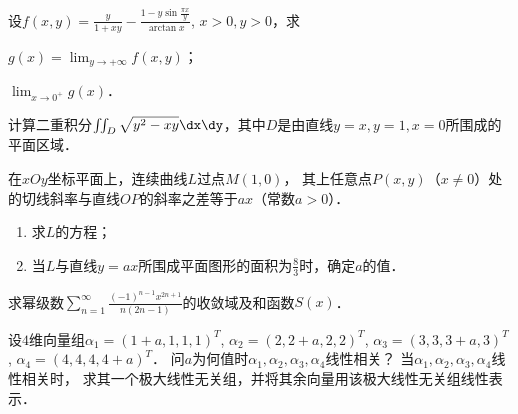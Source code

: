 \documentclass[plain,noanswer,medmath]{../../template/jnuexam}
\begin{document}










\begin{problem}[points=7]
设$f(x,y) = \frac{y}{1 + xy} - \frac{1 - y\sin \frac{\pi x}{y}}{\arctan x}$, $x > 0,y > 0$，求\par
\begin{enumerate*}
\item $g(x) = \lim_{y \to +\infty} f\left(x,y \right)$；
\item $\lim_{x \to 0^+} g(x)$．
\end{enumerate*}
\end{problem}


\begin{problem}[points=7]
计算二重积分$\iint_D \sqrt{y^2 - xy} \dx\dy$，其中$D$是由直线$y = x,y = 1,x = 0$所围成的平面区域．
\end{problem}




\begin{problem}[points=8]
在$xOy$坐标平面上，连续曲线$L$过点$M\left(1,0 \right)$，
其上任意点$P\left(x,y \right)$（$x \ne 0$）处的切线斜率与直线$OP$的斜率之差等于$ax$（常数$a > 0$）．
\begin{enumerate}
\item 求$L$的方程；
\item 当$L$与直线$y = ax$所围成平面图形的面积为$\frac{8}{3}$时，确定$a$的值．
\end{enumerate}
\end{problem}


\begin{problem}[points=10]
求幂级数$\sum_{n = 1}^{\infty}\frac{(- 1)^{n - 1}x^{2n + 1}}{n(2n - 1)}$的收敛域及和函数$S(x)$．
\end{problem}


\begin{problem}[points=13]
设$4$维向量组$\alpha_1 = (1 + a,1,1,1)^T$, $\alpha_2 = (2,2 + a,2,2)^T$, 
$\alpha_3 = (3,3,3 + a,3)^T$, $\alpha_4 = (4,4,4,4 + a)^T$．
问$a$为何值时$\alpha_1,\alpha_2,\alpha_3,\alpha_4$线性相关？
当$\alpha_1,\alpha_2,\alpha_3,\alpha_4$线性相关时，
求其一个极大线性无关组，并将其余向量用该极大线性无关组线性表示．
\end{problem}
\end{document}
